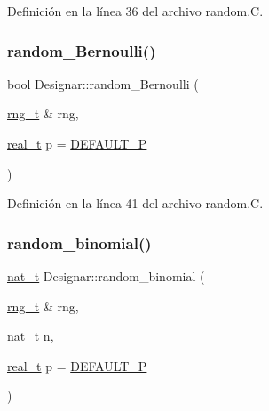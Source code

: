 Definición en la línea 36 del archivo random.\+C.

\mbox{\label{namespace_designar_adf6febbe5fa0abe44ea554203b767685}} 
\subsubsection{\texorpdfstring{random\+\_\+\+Bernoulli()}{random\_Bernoulli()}}
{\footnotesize\ttfamily bool Designar\+::random\+\_\+\+Bernoulli (\begin{DoxyParamCaption}\item[{\hyperlink{namespace_designar_a9ca84e2ff5daa62ebc4dab52f3a6c855}{rng\+\_\+t} \&}]{rng,  }\item[{\hyperlink{namespace_designar_aca2c32af26808dbec1f3a3071fad25ce}{real\+\_\+t}}]{p = {\ttfamily \hyperlink{namespace_designar_a2b9b8e0588e8d75548e74bd590e6f9e5}{D\+E\+F\+A\+U\+L\+T\+\_\+P}} }\end{DoxyParamCaption})}



Definición en la línea 41 del archivo random.\+C.

\mbox{\label{namespace_designar_a4f786bd2e0e15f81f468cf60b3a1d9fb}} 
\subsubsection{\texorpdfstring{random\+\_\+binomial()}{random\_binomial()}}
{\footnotesize\ttfamily \hyperlink{namespace_designar_aa72662848b9f4815e7bf31a7cf3e33d1}{nat\+\_\+t} Designar\+::random\+\_\+binomial (\begin{DoxyParamCaption}\item[{\hyperlink{namespace_designar_a9ca84e2ff5daa62ebc4dab52f3a6c855}{rng\+\_\+t} \&}]{rng,  }\item[{\hyperlink{namespace_designar_aa72662848b9f4815e7bf31a7cf3e33d1}{nat\+\_\+t}}]{n,  }\item[{\hyperlink{namespace_designar_aca2c32af26808dbec1f3a3071fad25ce}{real\+\_\+t}}]{p = {\ttfamily \hyperlink{namespace_designar_a2b9b8e0588e8d75548e74bd590e6f9e5}{D\+E\+F\+A\+U\+L\+T\+\_\+P}} }\end{DoxyParamCaption})}



